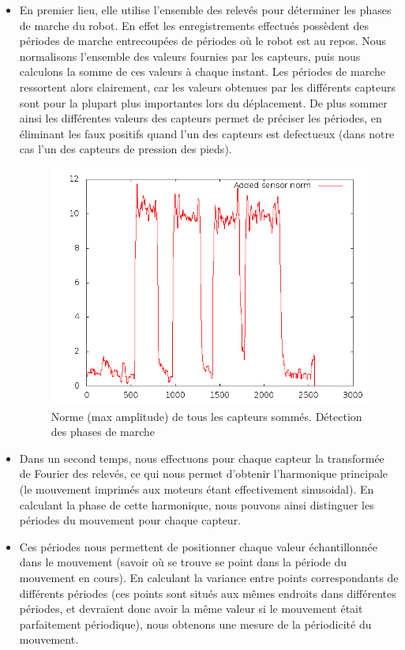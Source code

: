 \documentclass[11pt]{article}
\begin{document}
\begin{itemize}
\item En premier lieu, elle utilise l'ensemble des relevés pour déterminer les phases de marche du robot. En effet les enregistrements effectués possèdent des périodes de marche entrecoupées de périodes où le robot est au repos. Nous normalisons l'ensemble des valeurs fournies par les capteurs, puis nous calculons la somme de ces valeurs à chaque instant. Les périodes de marche ressortent alors clairement, car les valeurs obtenues par les différents capteurs sont pour la plupart plus importantes lors du déplacement. De plus sommer ainsi les différentes valeurs des capteurs permet de préciser les périodes, en éliminant les faux positifs quand l'un des capteurs est defectueux (dans notre cas l'un des capteurs de pression des pieds).

\begin{figure}[h]
    \includegraphics[scale=0.6]{walks.png}
    \caption{Norme (max amplitude) de tous les capteurs sommés. Détection des phases de marche}
\end{figure}

\item Dans un second temps, nous effectuons pour chaque capteur la transformée de Fourier des relevés, ce qui nous permet d'obtenir l'harmonique principale (le mouvement imprimés aux moteurs étant effectivement sinusoidal). En calculant la phase de cette harmonique, nous pouvons ainsi distinguer les périodes du mouvement pour chaque capteur.
\item Ces périodes nous permettent de positionner chaque valeur échantillonnée dans le mouvement (savoir où se trouve se point dans la période du mouvement en cours). En calculant la variance entre points correspondants de différents périodes (ces points sont situés aux mêmes endroits dans différentes périodes, et devraient donc avoir la même valeur si le mouvement était parfaitement périodique), nous obtenons une mesure de la périodicité du mouvement. 


\end{itemize}
\end{document}

